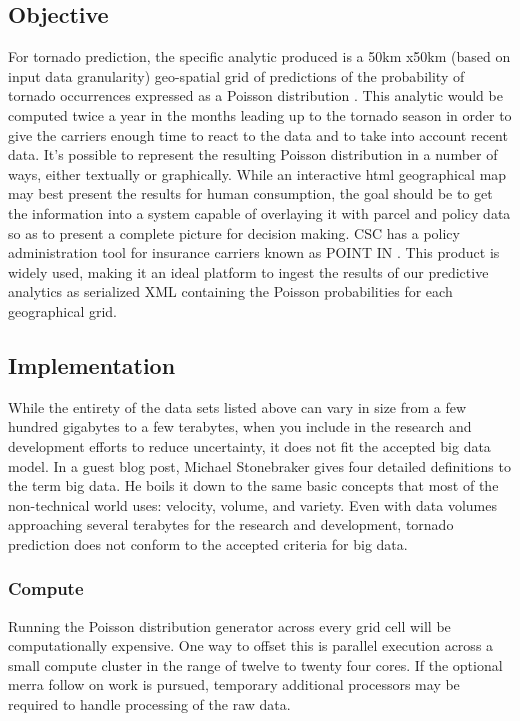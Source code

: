 \subsection{Objective}
For tornado prediction, the specific analytic produced is a 50km x50km (based on input data granularity) geo-spatial grid of predictions of the probability of tornado occurrences expressed as a Poisson distribution \cite{anderson}. This analytic would be computed twice a year in the months leading up to the tornado season in order to give the carriers enough time to react to the data and to take into account recent data. It's possible to represent the resulting Poisson distribution in a number of ways, either textually or graphically. While an interactive \gls{html} geographical map may best present the results for human consumption, the goal should be to get the information into a system capable of overlaying it with parcel and policy data so as to present a complete picture for decision making. \textsc{CSC} has a policy administration tool for insurance carriers known as POINT IN \cite{point_in}. This product is widely used, making it an ideal platform to ingest the results of our predictive analytics as serialized XML containing the Poisson probabilities for each geographical grid.
\subsection{Implementation}
While the entirety of the data sets listed above can vary in size from a few hundred gigabytes to a few terabytes, when you include in the research and development efforts to reduce uncertainty, it does not fit the accepted big data model. In a guest blog post, Michael Stonebraker gives four detailed definitions to the term big data\cite{stonebraker}. He boils it down to the same basic concepts that most of the non-technical world uses: velocity, volume, and variety. Even with data volumes approaching several terabytes for the research and development, tornado prediction does not conform to the accepted criteria for big data. 
\subsubsection{Compute}
Running the Poisson distribution generator across every grid cell will be computationally expensive. One way to offset this is parallel execution across a small compute cluster in the range of twelve to twenty four cores. If the optional \gls{merra} follow on work is pursued, temporary additional processors may be required to handle processing of the raw data.

